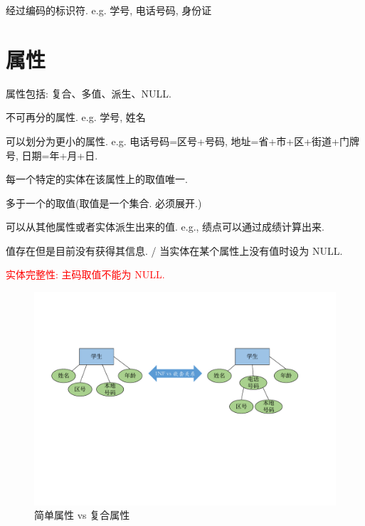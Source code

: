 \begin{definition}[智能码]
    经过编码的标识符. e.g. 学号, 电话号码, 身份证
\end{definition}

\section{属性}

属性包括: 复合、多值、派生、NULL.

\begin{definition}[简单属性]
     不可再分的属性. e.g. 学号, 姓名
\end{definition}

\begin{definition}
    可以划分为更小的属性. e.g. 电话号码=区号+号码, 地址=省+市+区+街道+门牌号, 日期=年+月+日.
\end{definition}

\begin{definition}[单值属性]
    每一个特定的实体在该属性上的取值唯一.
\end{definition}

\begin{definition}[多值属性]
    多于一个的取值(取值是一个集合. 必须展开.)
\end{definition}

\begin{definition}
    可以从其他属性或者实体派生出来的值. e.g., 绩点可以通过成绩计算出来.
\end{definition}

\begin{definition}[NULL 属性]
    值存在但是目前没有获得其信息. / 当实体在某个属性上没有值时设为 NULL.

    \textcolor{red}{实体完整性: 主码取值不能为 NULL.}
\end{definition}

\begin{figure}[H]
    \centering
    \includegraphics[width=.8\textwidth]{figure/多值.pdf}
    \caption{简单属性 vs 复合属性}
\end{figure}

